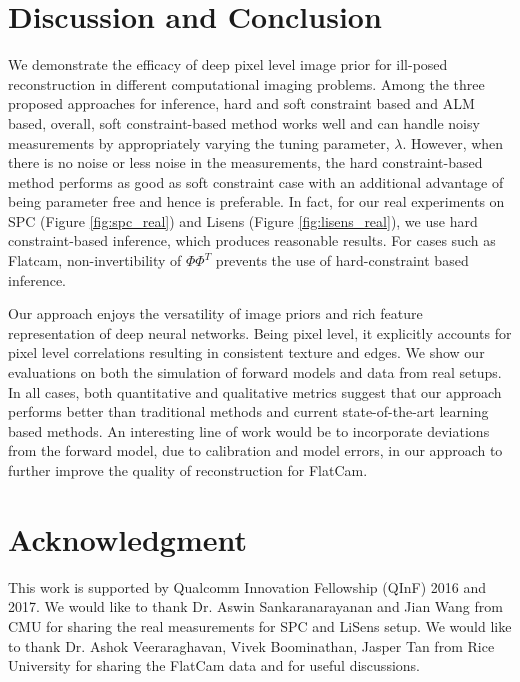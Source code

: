 \documentclass[journal,twoside]{IEEEtran}
\begin{document}
\section{Discussion and Conclusion}
We demonstrate the efficacy of deep pixel level image prior for ill-posed reconstruction in different computational imaging problems. Among the three proposed approaches for inference, hard and soft constraint based and ALM based, overall, soft constraint-based method works well and can handle noisy measurements by appropriately varying the tuning parameter, $\lambda$. However, when there is no noise or less noise in the measurements, the hard constraint-based method performs as good as soft constraint case with an additional advantage of being parameter free and hence is preferable. In fact, for our real experiments on SPC (Figure \ref{fig:spc_real}) and Lisens (Figure \ref{fig:lisens_real}), we use hard constraint-based inference, which produces reasonable results. For cases such as Flatcam, non-invertibility of $\Phi \Phi^T$ prevents the use of hard-constraint based inference.

Our approach enjoys the versatility of image priors and rich feature representation of deep neural networks. Being pixel level, it explicitly accounts for pixel level correlations resulting in consistent texture and edges. We show our evaluations on both the simulation of forward models and data from real setups. In all cases, both quantitative and qualitative metrics suggest that our approach performs better than traditional methods and current state-of-the-art learning based methods. An interesting line of work would be to incorporate deviations from the forward model, due to calibration and model errors, in our approach to further improve the quality of reconstruction for FlatCam. 

\section*{Acknowledgment}
This work is supported by Qualcomm Innovation Fellowship (QInF) 2016 and 2017. We would like to thank Dr. Aswin Sankaranarayanan and Jian Wang from CMU  for sharing the real measurements for SPC and LiSens setup. We would like to thank Dr. Ashok Veeraraghavan, Vivek Boominathan, Jasper Tan from Rice University for sharing the FlatCam data and for useful discussions. 
\end{document}
